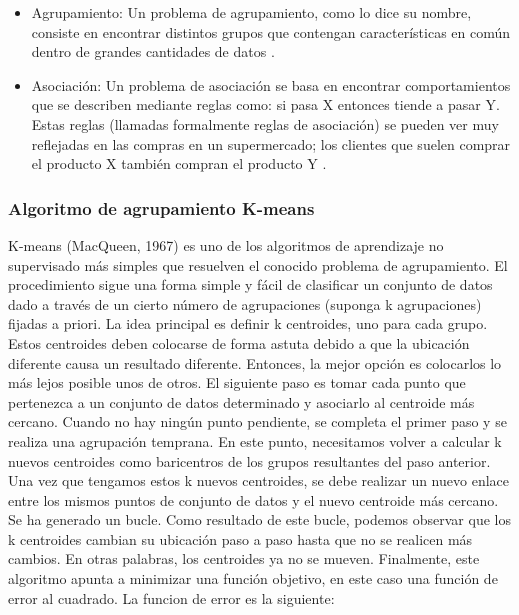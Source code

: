 \begin{itemize}
\item Agrupamiento: Un problema de agrupamiento, como lo dice su nombre, consiste en encontrar distintos grupos que contengan características en común dentro de grandes cantidades de datos \cite{Mostafa}.

\item Asociación: Un problema de asociación se basa en encontrar comportamientos que se describen mediante reglas como: si pasa X entonces tiende a pasar Y. Estas reglas (llamadas formalmente reglas de asociación) se pueden ver muy reflejadas en las compras en un supermercado; los clientes que suelen comprar el producto X también compran el producto Y \cite{Mostafa}. 
\end{itemize}

\subsubsection{Algoritmo de agrupamiento K-means}

K-means (MacQueen, 1967) es uno de los algoritmos de aprendizaje no supervisado más simples que resuelven el conocido problema de agrupamiento. El procedimiento sigue una forma simple y fácil de clasificar un conjunto de datos dado a través de un cierto número de agrupaciones (suponga k agrupaciones) fijadas a priori. La idea principal es definir k centroides, uno para cada grupo. Estos centroides deben colocarse de forma astuta debido a que la ubicación diferente causa un resultado diferente. Entonces, la mejor opción es colocarlos lo más lejos posible unos de otros. El siguiente paso es tomar cada punto que pertenezca a un conjunto de datos determinado y asociarlo al centroide más cercano. Cuando no hay ningún punto pendiente, se completa el primer paso y se realiza una agrupación temprana. En este punto, necesitamos volver a calcular k nuevos centroides como baricentros de los grupos resultantes del paso anterior. Una vez que tengamos estos k nuevos centroides, se debe realizar un nuevo enlace entre los mismos puntos de conjunto de datos y el nuevo centroide más cercano. Se ha generado un bucle. Como resultado de este bucle, podemos observar que los k centroides cambian su ubicación paso a paso hasta que no se realicen más cambios. En otras palabras, los centroides ya no se mueven.
Finalmente, este algoritmo apunta a minimizar una función objetivo, en este caso una función de error al cuadrado. La funcion de error es la siguiente: \cite{kmeans}
\FloatBarrier

